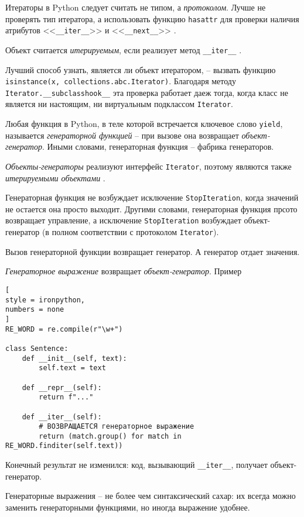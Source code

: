 \documentclass[%
	11pt,
	a4paper,
	utf8,
		]{article}
\begin{document}
Итераторы в Python следует считать не типом, а \emph{протоколом}. Лучше не проверять тип итератора, а использовать функцию \verb|hasattr| для проверки наличия атрибутов <<\verb*|__iter__|>> и <<\verb|__next__|>> \cite[]{ramalho:python-2022}.

Объект считается \emph{итерируемым}, если реализует метод \verb|__iter__| \cite[]{ramalho:python-2022}.

Лучший способ узнать, является ли объект итератором, -- вызвать функцию\\ \verb|isinstance(x, collections.abc.Iterator)|. Благодаря методу \verb|Iterator.__subclasshook__| эта проверка работает даеж тогда, когда класс не является ни настоящим, ни виртуальным подклассом \verb*|Iterator|.

Любая функция в Python, в теле которой встречается ключевое слово \verb|yield|, называется \emph{генераторной функцией} -- при вызове она возвращает \emph{объект-генератор}. Иными словами, генераторная функция -- фабрика генераторов.

\emph{Объекты-генераторы} реализуют интерфейс \verb*|Iterator|, поэтому являются также \emph{итерируемыми объектами} \cite[]{ramalho:python-2022}.

Генераторная функция не возбуждает исключение \verb*|StopIteration|, когда значений не остается она просто выходит. Другими словами, генераторная функция прсото возвращает управление, а исключение \verb|StopIteration| возбуждает объект-генератор (в полном соответствии с протоколом \verb*|Iterator|).

Вызов генераторной функции возвращает генератор. А генератор отдает значения.

\emph{Генераторное выражение} возвращает \emph{объект-генератор}. Пример
\begin{lstlisting}[
style = ironpython,
numbers = none
]
RE_WORD = re.compile(r"\w+")

class Sentence:
    def __init__(self, text):
        self.text = text
        
    def __repr__(self):
        return f"..."
        
    def __iter__(self):
        # ВОЗВРАЩАЕТСЯ генераторное выражение
        return (match.group() for match in RE_WORD.finditer(self.text))
\end{lstlisting}

Конечный результат не изменился: код, вызывающий \verb|__iter__|, получает объект-генератор.

Генераторные выражения -- не более чем синтаксический сахар: их всегда можно заменить генераторными функциями, но иногда выражение удобнее.
\end{document}
